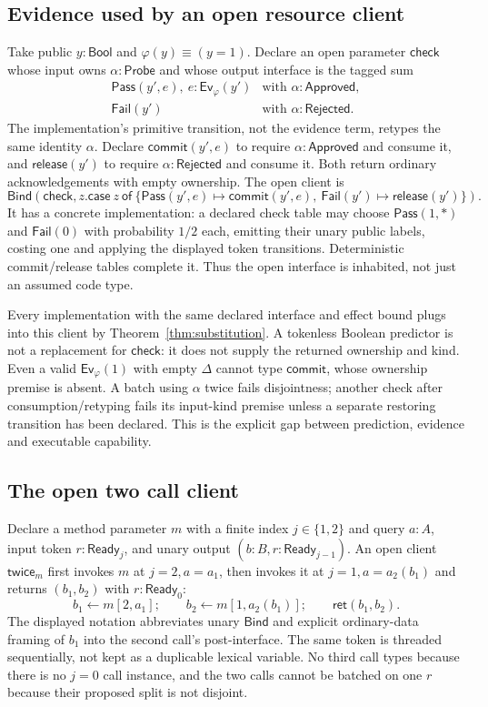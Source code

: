 \documentclass[11pt,a4paper]{article}
\theoremstyle{definition}
\newcommand{\Ev}{\mathsf{Ev}}
\newcommand{\Ret}{\mathsf{ret}}
\newcommand{\Bind}{\mathsf{Bind}}
\begin{document}
\subsection{Evidence used by an open resource client}
Take public $y:\mathsf{Bool}$ and $\varphi(y)\equiv(y=1)$. Declare an open
parameter $\mathsf{check}$ whose input owns $\alpha:\mathsf{Probe}$ and
whose output interface is the tagged sum
\[
 \begin{array}{ll}
 \mathsf{Pass}(y',e),\ e:\Ev_\varphi(y')
       &\text{with }\alpha:\mathsf{Approved},\\
 \mathsf{Fail}(y')&\text{with }\alpha:\mathsf{Rejected}.
 \end{array}
\]
The implementation's primitive transition, not the evidence term, retypes
the same identity $\alpha$. Declare $\mathsf{commit}(y',e)$ to require
$\alpha:\mathsf{Approved}$ and consume it, and $\mathsf{release}(y')$ to
require $\alpha:\mathsf{Rejected}$ and consume it. Both return ordinary
acknowledgements with empty ownership. The open client is
\[
 \Bind(\mathsf{check},z.
 \mathsf{case}\ z\ \mathsf{of}\
 \{\mathsf{Pass}(y',e)\mapsto\mathsf{commit}(y',e),\
   \mathsf{Fail}(y')\mapsto\mathsf{release}(y')\}).
\]
It has a concrete implementation: a declared check table may choose
$\mathsf{Pass}(1,*)$ and $\mathsf{Fail}(0)$ with probability $1/2$ each,
emitting their unary public labels, costing one and applying the displayed
token transitions. Deterministic commit/release tables complete it.
Thus the open interface is inhabited, not just an assumed code type.

Every implementation with the same declared interface and effect bound
plugs into this client by Theorem~\ref{thm:substitution}. A tokenless Boolean
predictor is not a replacement for $\mathsf{check}$: it does not supply the
returned ownership and kind. Even a valid $\Ev_\varphi(1)$ with empty
$\Delta$ cannot type $\mathsf{commit}$, whose ownership premise is absent.
A batch using $\alpha$ twice fails disjointness; another check after
consumption/retyping fails its input-kind premise unless a separate
restoring transition has been declared. This is the explicit gap between
prediction, evidence and executable capability.

\subsection{The open two call client}
Declare a method parameter $m$ with a finite index $j\in\{1,2\}$ and
query $a:A$, input token $r:\mathsf{Ready}_j$, and unary output
$(b:B,r:\mathsf{Ready}_{j-1})$. An open client $\mathsf{twice}_m$ first
invokes $m$ at $j=2,a=a_1$, then invokes it at $j=1,a=a_2(b_1)$ and
returns $(b_1,b_2)$ with $r:\mathsf{Ready}_0$:
\[
 b_1\leftarrow m[2,a_1];\qquad
 b_2\leftarrow m[1,a_2(b_1)];\qquad
 \Ret(b_1,b_2).
\]
The displayed notation abbreviates unary $\Bind$ and explicit ordinary-data
framing of $b_1$ into the second call's post-interface. The same token is
threaded sequentially, not kept as a duplicable lexical variable. No third
call types because there is no $j=0$ call instance, and the two calls cannot
be batched on one $r$ because their proposed split is not disjoint.
\end{document}
